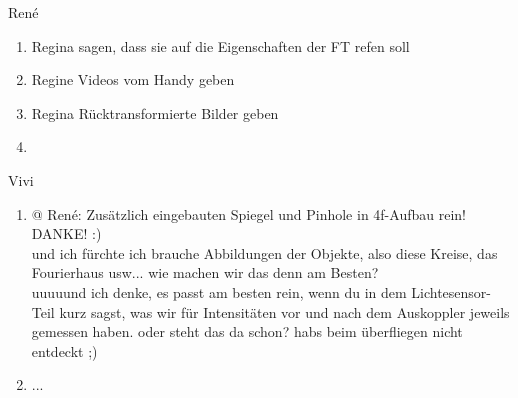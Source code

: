 
René
\begin{enumerate}
	\item Regina sagen, dass sie auf die Eigenschaften der FT refen soll
	\item Regine Videos vom Handy geben
	\item Regina Rücktransformierte Bilder geben
	\item 
\end{enumerate}

Vivi
\begin{enumerate}
	\item @ René: Zusätzlich eingebauten Spiegel und Pinhole in 4f-Aufbau rein! DANKE!  :) \\
	und ich fürchte ich brauche Abbildungen der Objekte, also diese Kreise, das Fourierhaus usw... wie machen wir das denn am Besten?  \\
	uuuuund ich denke, es passt am besten rein, wenn du in dem Lichtesensor-Teil kurz sagst, was wir für Intensitäten vor und nach dem Auskoppler jeweils gemessen haben. oder steht das da schon? habs beim überfliegen nicht entdeckt ;)  
	\item ...
\end{enumerate}